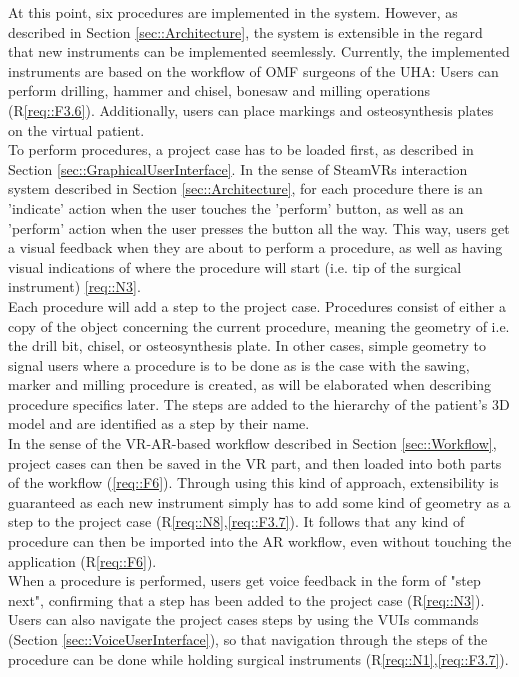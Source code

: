 At this point, six procedures are implemented in the system.
However, as described in Section \ref{sec::Architecture}, the system is extensible in the regard that new instruments can be implemented seemlessly.
Currently, the implemented instruments are based on the workflow of OMF surgeons of the UHA: Users can perform drilling, hammer and chisel, bonesaw and milling operations (R\ref{req::F3.6}).
Additionally, users can place markings and osteosynthesis plates on the virtual patient.
\\ To perform procedures, a project case has to be loaded first, as described in Section \ref{sec::GraphicalUserInterface}.
In the sense of SteamVRs interaction system described in Section \ref{sec::Architecture}, for each procedure there is an 'indicate' action when the user touches the 'perform' button, as well as an 'perform' action when the user presses the button all the way.
This way, users get a visual feedback when they are about to perform a procedure, as well as having visual indications of where the procedure will start (i.e. tip of the surgical instrument) \ref{req::N3}.
\\ Each procedure will add a step to the project case.
Procedures consist of either a copy of the object concerning the current procedure, meaning the geometry of i.e. the drill bit, chisel, or osteosynthesis plate.
In other cases, simple geometry to signal users where a procedure is to be done as is the case with the sawing, marker and milling procedure is created, as will be elaborated when describing procedure specifics later.
The steps are added to the hierarchy of the patient's 3D model and are identified as a step by their name.
\\ In the sense of the VR-AR-based workflow described in Section \ref{sec::Workflow}, project cases can then be saved in the VR part, and then loaded into both parts of the workflow (\ref{req::F6}).
Through using this kind of approach, extensibility is guaranteed as each new instrument simply has to add some kind of geometry as a step to the project case (R\ref{req::N8},\ref{req::F3.7}).
It follows that any kind of procedure can then be imported into the AR workflow, even without touching the application (R\ref{req::F6}).
\\ When a procedure is performed, users get voice feedback in the form of "step next", confirming that a step has been added to the project case (R\ref{req::N3}).
Users can also navigate the project cases steps by using the VUIs commands (Section \ref{sec::VoiceUserInterface}), so that navigation through the steps of the procedure can be done while holding surgical instruments (R\ref{req::N1},\ref{req::F3.7}).
